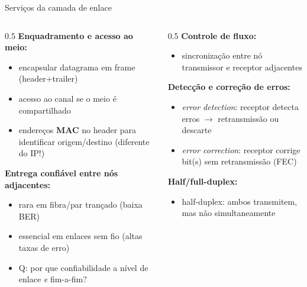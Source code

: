 \documentclass[aspectratio=169,11pt]{beamer}
\begin{document}
\begin{frame}{Serviços da camada de enlace}
  \begin{columns}
    \begin{column}{0.5\textwidth}
      \textbf{Enquadramento e acesso ao meio:}
      \begin{itemize}
        \item encapsular datagrama em frame (header+trailer)
        \item acesso ao canal se o meio é compartilhado
        \item endereços \textbf{MAC} no header para identificar origem/destino (diferente do IP!)
      \end{itemize}
      \textbf{Entrega confiável entre nós adjacentes:}
      \begin{itemize}
        \item rara em fibra/par trançado (baixa BER)
        \item essencial em enlaces sem fio (altas taxas de erro)
        \item \alert{Q: por que confiabilidade a nível de enlace \emph{e} fim-a-fim?}
      \end{itemize}
    \end{column}
    \begin{column}{0.5\textwidth}
      \textbf{Controle de fluxo:}
      \begin{itemize}
        \item sincronização entre nó transmissor e receptor adjacentes
      \end{itemize}
      \textbf{Detecção e correção de erros:}
      \begin{itemize}
        \item \emph{error detection}: receptor detecta erros $\rightarrow$ retransmissão ou descarte
        \item \emph{error correction}: receptor corrige bit(s) sem retransmissão (FEC)
      \end{itemize}
      \textbf{Half/full-duplex:}
      \begin{itemize}
        \item half-duplex: ambos transmitem, mas não simultaneamente
      \end{itemize}
    \end{column}
  \end{columns}
\end{frame}
\end{document}
